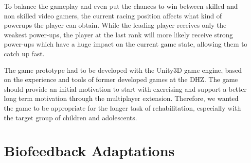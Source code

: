 \begin{multicols}{2}
To balance the gameplay and even put the chances to win between skilled and non skilled video gamers, the current racing position affects what kind of powerups the player can obtain. While the leading player receives only the weakest power-ups, the player at the last rank will more likely receive strong power-ups which have a huge impact on the current game state, allowing them to catch up fast.

The game prototype had to be developed with the Unity3D game engine, based on the experience and tools of former developed games at the DHZ. The game should provide an initial motivation to start with exercising and support a better long term motivation through the multiplayer extension. Therefore, we wanted the game to be appropriate for the longer task of rehabilitation, especially with the target group of children and adolescents. 


\section{Biofeedback Adaptations}


\end{multicols}
